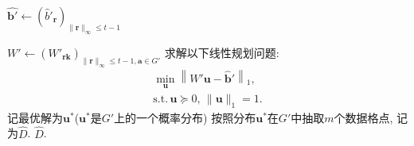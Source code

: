 \begin{algorithm}[hbtp]
\begin{algorithmic}[1]
  \STATE $\hat{\mathbf{b}'} \leftarrow \left(\hat{b}'_{\mathbf{r}}\right)_{\|\mathbf{r}\|_{\infty}\le t-1}$

  \STATE $W' \leftarrow (W'_{\mathbf{rk}})_{\|\mathbf{r}\|_{\infty} \le t-1,
  \mathbf{a}\in G'}$
  \STATE 求解以下线性规划问题: 
  \begin{align*}
    \min_{\mathbf{u}} \left\| W'\mathbf{u} - \hat{\mathbf{b}}'\right\|_{1}, \\
    \text{s.t.}\, \mathbf{u} \succeq 0,\, \|\mathbf{u}\|_1 =1.
  \end{align*}
  记最优解为$\mathbf{u}^*$($\mathbf{u}^*$是$G'$上的一个概率分布) \label{alg:line:改进三角机制I:线性规划}
  \STATE 按照分布$\mathbf{u}^*$在$G'$中抽取$m$个数据格点, 记为$\hat{D}$. \label{alg:line:改进三角机制I:生成合成数据库}
  \RETURN $\hat{D}$.
\end{algorithmic}
\end{algorithm}
